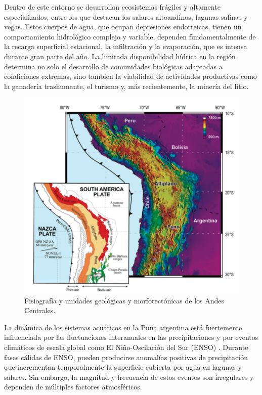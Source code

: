 Dentro de este entorno se desarrollan ecosistemas frágiles y altamente especializados, entre los que destacan los salares altoandinos, lagunas salinas y vegas. Estos cuerpos de agua, que ocupan depresiones endorreicas, tienen un comportamiento hidrológico complejo y variable, dependen fundamentalmente de la recarga superficial estacional, la infiltración y la evaporación, que es intensa durante gran parte del año. La limitada disponibilidad hídrica en la región determina no solo el desarrollo de comunidades biológicas adaptadas a condiciones extremas, sino también la viabilidad de actividades productivas como la ganadería trashumante, el turismo y, más recientemente, la minería del litio.


\begin{figure}[htpb]
	\centering
	\includegraphics[scale=.6]{./Figures/fig1.png}
	\caption{Fisiografía y unidades geológicas y morfotectónicas de los Andes Centrales\protect\footnotemark.}
	\label{fig:fisiografia}
\end{figure}
\FloatBarrier

La dinámica de los sistemas acuáticos en la Puna argentina está fuertemente influenciada por las fluctuaciones interanuales en las precipitaciones y por eventos climáticos de escala global como El Niño-Oscilación del Sur (ENSO) \cite{trenberth1997definition}. Durante fases cálidas de ENSO, pueden producirse anomalías positivas de precipitación que incrementan temporalmente la superficie cubierta por agua en lagunas y salares. Sin embargo, la magnitud y frecuencia de estos eventos son irregulares y dependen de múltiples factores atmosféricos.

